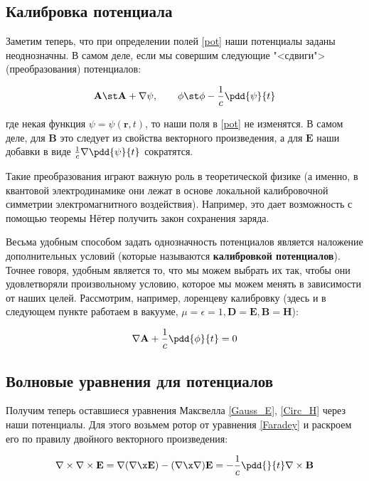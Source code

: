 \documentclass[12pt]{kiarticle}
\begin{document}
\subsection{Калибровка потенциала}

Заметим теперь, что при определении полей \eqref{pot} наши потенциалы заданы неоднозначны. В самом деле, если мы совершим следующие "<сдвиги"> (преобразования) потенциалов: 

\begin{equation}\label{psi}
\mathbf{A} \st \mathbf{A} + \nabla \psi, \qquad \phi \st \phi - \dfrac{1}{c} \pdd{\psi}{t}
\end{equation}

где некая функция $ \psi = \psi(\mathbf{r}, t) $, то наши поля в \eqref{pot} не изменятся. В самом деле, для $ \mathbf{B}  $ это следует из свойства векторного произведения, а для $ \mathbf{E} $ наши добавки в виде $ \frac{1}{c} \nabla \pdd{\psi}{t} $ сократятся. 

Такие преобразования играют важную роль в теоретической физике (а именно, в квантовой электродинамике они лежат в основе локальной калибровочной симметрии электромагнитного воздействия). Например, это дает возможность с помощью теоремы Нётер получить закон сохранения заряда. 

Весьма удобным способом задать однозначность потенциалов является наложение дополнительных условий (которые называются \textbf{калибровкой потенциалов}). Точнее говоря, удобным является то, что мы можем выбрать их так, чтобы они удовлетворяли произвольному условию, которое мы можем менять в зависимости от наших целей. Рассмотрим, например, лоренцеву калибровку (здесь и в следующем пункте работаем в вакууме, $ \mu = \epsilon = 1, \mathbf{D} = \mathbf{E}, \mathbf{B} = \mathbf{H} $): 

\begin{equation}\label{Lorents}
\nabla \mathbf{A}+ \dfrac{1}{c} \pdd{\phi}{t} = 0
\end{equation}

\subsection{Волновые уравнения для потенциалов}

Получим теперь оставшиеся уравнения Максвелла \eqref{Gauss_E}, \eqref{Circ_H} через наши потенциалы. Для этого возьмем ротор от уравнения \eqref{Faradey} и раскроем его по правилу двойного векторного произведения:

\begin{equation}\label{}
\nabla \times \nabla \times \mathbf{E} = \nabla (\nabla \x \mathbf{E}) - (\nabla \x \nabla) \mathbf{E} = - \dfrac{1}{c} \pdd{}{t}\nabla \times \mathbf{B}
\end{equation}
\end{document}
